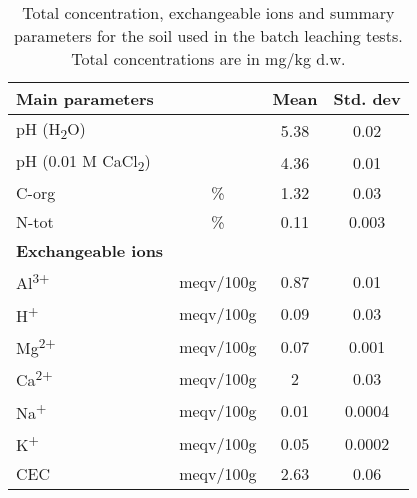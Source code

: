 \begin{table}
\centering
\caption{Total concentration, exchangeable ions and summary parameters for the soil used in the batch leaching tests. Total concentrations are in mg/kg d.w.}
\label{apptab:soil}
\begin{tabular}{lccc}
\toprule
\multicolumn{1}{l}{\textbf{Main parameters}}          &                               & \textbf{Mean}                          & \textbf{Std. dev}                      \\ \hline \addlinespace
pH (H\textsubscript{2}O)                      &                               & 5.38                          & 0.02                          \\
pH (0.01 M CaCl\textsubscript{2})             &                               & 4.36                          & 0.01                          \\
C-org                         & \%                            & 1.32                         & 0.03                          \\
N-tot                         & \%                            & 0.11                          & 0.003                         \\ \hline
\textbf{Exchangeable ions}    & \multicolumn{1}{l}{\textbf{}} & \multicolumn{1}{l}{\textbf{}} & \multicolumn{1}{l}{\textbf{}} \\ \hline \addlinespace
Al\textsuperscript{3+}                          & meqv/100g                     & 0.87                          & 0.01                          \\
H\textsuperscript{+}                            & meqv/100g                     & 0.09                          & 0.03                          \\
Mg\textsuperscript{2+}                          & meqv/100g                     & 0.07                          & 0.001                         \\
Ca\textsuperscript{2+}                          & meqv/100g                     & 2                          & 0.03                          \\
Na\textsuperscript{+}                           & meqv/100g                     & 0.01                          & 0.0004                        \\
K\textsuperscript{+}                            & meqv/100g                     & 0.05                          & 0.0002                        \\
CEC                           & meqv/100g                     & 2.63                          & 0.06                          \\ \hline

\end{tabular}
\end{table}
